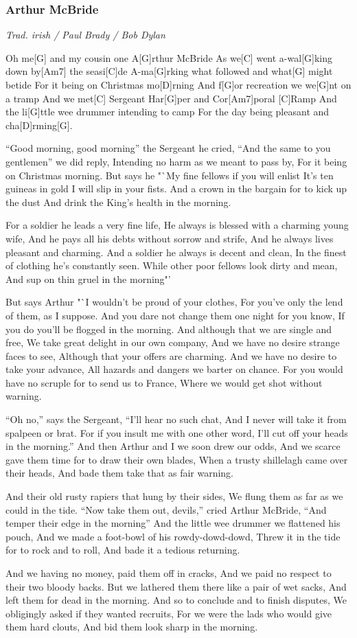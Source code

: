 \documentclass[a5paper,pagesize,twoside,10pt,headings=small]{scrartcl}
\newcommand\songheader[3][]{%
    \subsubsection*{\centering #2}\vspace{0.5\baselineskip}%
    \addcontentsline{toc}{subsection}{#2}
    \centering \textit{#3}\\%
    \vspace{\baselineskip}\par%
}
\newenvironment{myguitar}{\begin{guitar}}{\clearpage\end{guitar}}
\begin{document}
\songheader{Arthur McBride}{Trad. irish / Paul Brady / Bob Dylan}
\begin{myguitar}
Oh me[G] and my cousin one A[G]rthur McBride
As we[C] went a-wal[G]king down by[Am7] the seasi[C]de
A-ma[G]rking what followed and what[G] might betide
For it being on Christmas mo[D]rning
And f[G]or recreation we we[G]nt on a tramp
And we met[C] Sergeant Har[G]per and Cor[Am7]poral [C]Ramp
And the li[G]ttle wee drummer intending to camp
For the day being pleasant and cha[D]rming[G].

"`Good morning, good morning"' the Sergeant he cried,
"`And the same to you gentlemen"' we did reply,
Intending no harm as we meant to pass by,
For it being on Christmas morning.
But says he "`My fine fellows if you will enlist
It's ten guineas in gold I will slip in your fists.
And a crown in the bargain for to  kick up the dust
And drink the King's health in the morning.

For a soldier he leads a very fine life,
He always is blessed with a charming young wife,
And he pays all his debts without sorrow and strife,
And he always lives pleasant and charming.
And a soldier he always is decent and clean,
In the finest of clothing he's constantly seen.
While other poor fellows look dirty and mean,
And sup on thin gruel in the morning"'

But says Arthur "`I wouldn't be proud of your clothes,
For you've only the lend of them, as I suppose.
And you dare not change them one night for you know,
If you do you'll be flogged in the morning.
And although that we are single and free,
We take great delight in our own company,
And we have no desire strange faces to see,
Although that your offers are charming.
And we have no desire to take your advance,
All hazards and dangers we barter on chance.
For you would have no scruple for to send us to France,
Where we would get shot without warning.

"`Oh no,"' says the Sergeant, "`I'll hear no such chat,
And I never will take it from spalpeen or brat.
For if you insult me with one other word,
I'll cut off your heads in the morning."'
And then Arthur and I we soon drew our odds,
And we scarce gave them time for to draw their own blades,
When a trusty shillelagh came over their heads,
And bade them take that as fair warning.

And their old rusty rapiers that hung by their sides,
We flung them as far as we could in the tide.
"`Now take them out, devils,"' cried Arthur McBride,
"`And temper their edge in the morning"'
And the little wee drummer we flattened his pouch,
And we made a foot-bowl of his rowdy-dowd-dowd,
Threw it in the tide for to rock and to roll,
And bade it a tedious returning.

And we having no money, paid them off in cracks,
And we paid no respect to their two bloody backs.
But we lathered them there like a pair of wet sacks,
And left them for dead in the morning.
And so to conclude and to finish disputes,
We obligingly asked if they wanted recruits,
For we were the lads who would give them hard clouts,
And bid them look sharp in the morning.
\end{myguitar}
\end{document}
